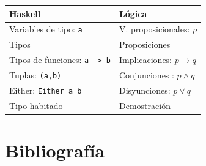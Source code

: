 \documentclass{beamer}
\begin{document}
\begin{frame}
\begin{table}[htbp]
\begin{center}
\begin{tabular}{|l|l|}
\hline
Haskell & Lógica \\
\hline \hline
Variables de tipo:  \texttt{a} & V. proposicionales: $p$  \\ \hline
Tipos & Proposiciones \\ \hline
Tipos de funciones: \texttt{a -> b} & Implicaciones: $p\rightarrow q$ \\ \hline
Tuplas: \texttt{(a,b)} & Conjunciones : $p\wedge q$ \\ \hline
Either: \texttt{Either a b} & Disyunciones: $p\vee q$ \\ \hline  
Tipo habitado & Demostración \\ \hline  
\end{tabular}
\end{center}
\end{table}
  

\end{frame}
\section{Bibliografía}
\begin{frame}[allowframebreaks]
\nocite{*} %
\small{
\vspace{0.75in}}
\end{frame}
\end{document}
